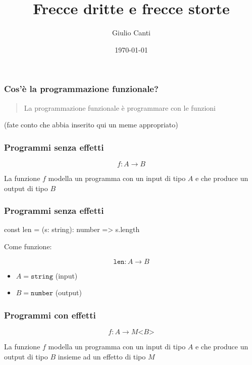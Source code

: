 \documentclass{beamer}
\title{Frecce dritte e frecce storte}
\author{Giulio Canti}
\date{\today}
\newenvironment{code}
  {\vspace{0.5cm} \VerbatimEnvironment\begin{typescriptcode}}
  {\end{typescriptcode} \vspace{0.2cm}}
\begin{document}
\begin{frame}
\titlepage %
\end{frame}


\begin{frame}
\frametitle{Cos'è la programmazione funzionale?}

\begin{quote}
La programmazione funzionale è programmare con le funzioni
\end{quote}

\centerline{(fate conto che abbia inserito qui un meme appropriato)}

\end{frame}

\begin{frame}[fragile]
\frametitle{Programmi senza effetti}

$$
f: A \rightarrow B
$$

La funzione $f$ modella un programma con un input di tipo $A$ e che produce un output di tipo $B$

\end{frame}

\begin{frame}[fragile]
\frametitle{Programmi senza effetti}

\begin{code}
const len = (s: string): number => s.length
\end{code}

Come funzione:

$$
\texttt{len}: A \rightarrow B
$$

\begin{itemize}
  \item $A = \texttt{string}$ (input)
  \item $B = \texttt{number}$ (output)
\end{itemize}

\end{frame}

\begin{frame}
\frametitle{Programmi con effetti}

$$
f: A \rightarrow M \texttt{<} B \texttt{>}
$$

La funzione $f$ modella un programma con un input di tipo $A$ e che produce un output di tipo $B$ insieme ad un effetto di tipo $M$

\end{frame}
\end{document}
